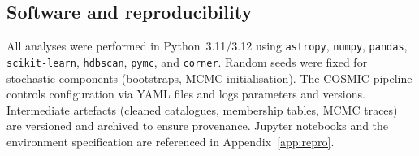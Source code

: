 \documentclass[../main.tex]{subfiles}
\begin{document}
\subsection{Software and reproducibility}
\label{subsec:reproducibility}
All analyses were performed in Python~3.11/3.12 using \texttt{astropy}, \texttt{numpy}, \texttt{pandas}, \texttt{scikit-learn}, \texttt{hdbscan}, \texttt{pymc}, and \texttt{corner}. Random seeds were fixed for stochastic components (bootstraps, MCMC initialisation). The \textsc{COSMIC} pipeline controls configuration via YAML files and logs parameters and versions. Intermediate artefacts (cleaned catalogues, membership tables, MCMC traces) are versioned and archived to ensure provenance. Jupyter notebooks and the environment specification are referenced in Appendix~\ref{app:repro}.

\biblio
\end{document}
